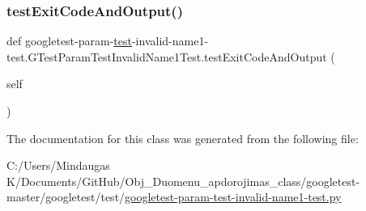 \subsubsection{\texorpdfstring{testExitCodeAndOutput()}{testExitCodeAndOutput()}}
{\footnotesize\ttfamily def googletest-\/param-\/\mbox{\hyperlink{_mutual_8h_a707ee03719e99670bf6cfdfd897b8456}{test}}-\/invalid-\/name1-\/test.\+G\+Test\+Param\+Test\+Invalid\+Name1\+Test.\+test\+Exit\+Code\+And\+Output (\begin{DoxyParamCaption}\item[{}]{self }\end{DoxyParamCaption})}



The documentation for this class was generated from the following file\+:\begin{DoxyCompactItemize}
\item 
C\+:/\+Users/\+Mindaugas K/\+Documents/\+Git\+Hub/\+Obj\+\_\+\+Duomenu\+\_\+apdorojimas\+\_\+class/googletest-\/master/googletest/test/\mbox{\hyperlink{googletest-master_2googletest_2test_2googletest-param-test-invalid-name1-test_8py}{googletest-\/param-\/test-\/invalid-\/name1-\/test.\+py}}\end{DoxyCompactItemize}
